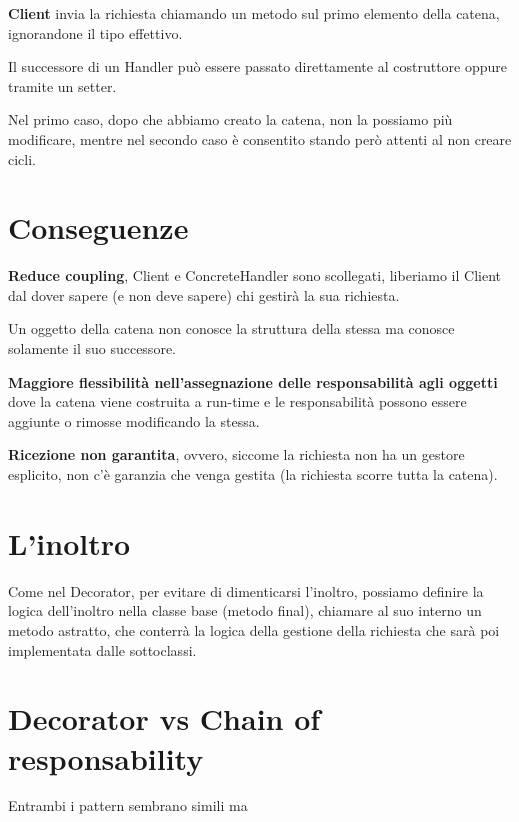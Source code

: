 \textbf{Client} invia la richiesta chiamando un metodo sul primo elemento della catena, ignorandone il tipo effettivo.
\medskip

Il successore di un Handler può essere passato direttamente al costruttore oppure tramite un setter.

Nel primo caso, dopo che abbiamo creato la catena, non la possiamo più modificare, mentre nel secondo caso è consentito stando però attenti al non creare cicli.

\section{Conseguenze}

\textbf{Reduce coupling}, Client e ConcreteHandler sono scollegati, liberiamo il Client dal dover sapere (e non deve sapere) chi gestirà la sua richiesta. 

Un oggetto della catena non conosce la struttura della stessa ma conosce solamente il suo successore.

\textbf{Maggiore flessibilità nell'assegnazione delle responsabilità agli oggetti} dove la catena viene costruita a run-time e le responsabilità possono essere 
aggiunte o rimosse modificando la stessa.

\textbf{Ricezione non garantita}, ovvero, siccome la richiesta non ha un gestore esplicito, non c'è garanzia che venga gestita (la richiesta scorre tutta la catena).

\section{L'inoltro}

Come nel Decorator, per evitare di dimenticarsi l'inoltro, possiamo definire la logica dell'inoltro nella classe base (metodo final), chiamare al suo interno un metodo 
astratto, che conterrà la logica della gestione della richiesta che sarà poi implementata dalle sottoclassi.

\section{Decorator vs Chain of responsability}

Entrambi i pattern sembrano simili ma 

